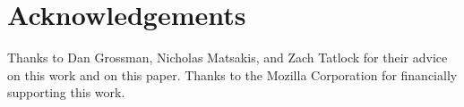 \section*{Acknowledgements}
Thanks to Dan Grossman, Nicholas Matsakis, and Zach Tatlock for their advice
on this work and on this paper. Thanks to the Mozilla Corporation for
financially supporting this work.
